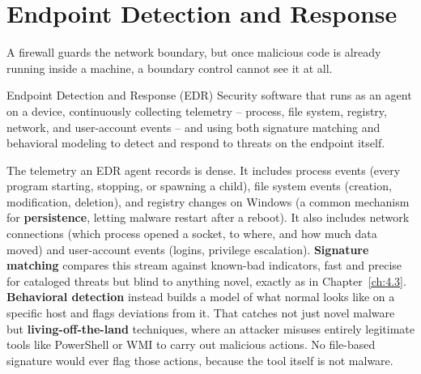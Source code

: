 \section{Endpoint Detection and Response}

A firewall guards the network boundary, but once malicious code is already running inside a
machine, a boundary control cannot see it at all.

\begin{definition}{Endpoint Detection and Response (EDR)}
Security software that runs as an agent on a device, continuously collecting telemetry -- process,
file system, registry, network, and user-account events -- and using both signature matching and
behavioral modeling to detect and respond to threats on the endpoint itself.
\end{definition}

The telemetry an EDR agent records is dense. It includes process events (every program starting,
stopping, or spawning a child), file system events (creation, modification, deletion), and registry
changes on Windows (a common mechanism for \textbf{persistence}, letting malware restart after a
reboot). It also includes network connections (which process opened a socket, to where, and how
much data moved) and user-account events (logins, privilege escalation). \textbf{Signature matching}
compares this stream against known-bad indicators, fast and precise for cataloged threats but blind
to anything novel, exactly as in Chapter~\ref{ch:4.3}. \textbf{Behavioral detection} instead builds a
model of what normal looks like on a specific host and flags deviations from it. That catches not
just novel malware but \textbf{living-off-the-land} techniques, where an attacker misuses entirely
legitimate tools like PowerShell or WMI to carry out malicious actions. No file-based signature would
ever flag those actions, because the tool itself is not malware.

